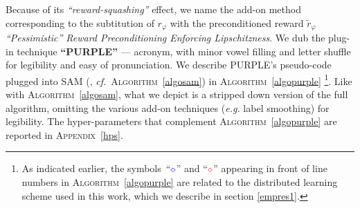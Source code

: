 Because of its \textit{``reward-squashing''} effect,
we name the add-on method corresponding to the subtitution of $r_\varphi$ with
the preconditioned reward $\tilde{r}_\varphi$
\emph{``Pessimistic'' Reward Preconditioning Enforcing Lipschitzness}.
We dub the plug-in technique \textbf{``PURPLE''} ---
acronym, with minor vowel filling and letter shuffle for legibility and
easy of pronunciation.
We describe PURPLE's pseudo-code plugged into
SAM (\cite{Blonde2019-vc}, \textit{cf.}~\textsc{Algorithm}~\ref{algosam})
in \textsc{Algorithm}~\ref{algopurple}
\footnote{As indicated earlier, the symbols~``$\textcolor{blue}{\diamond}$''
and ``$\textcolor{red}{\diamond}$'' appearing
in front of line numbers in \textsc{Algorithm}~\ref{algopurple}
are related to the distributed learning scheme
used in this work, which we describe in section \ref{empres1}.}.
Like with \textsc{Algorithm}~\ref{algosam}, what we depict is a stripped down version of the full algorithm,
omitting the various add-on techniques (\textit{e.g.} label smoothing)
for legibility.
The hyper-parameters that complement \textsc{Algorithm}~\ref{algopurple}
are reported in \textsc{Appendix}~\ref{hps}.

